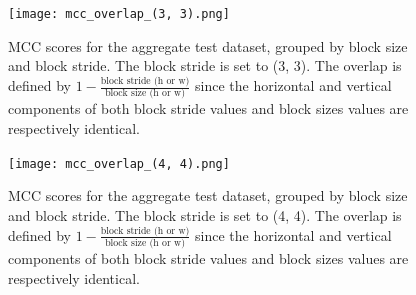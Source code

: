 \begin{figure}
    \centering
    \texttt{[image: mcc\_overlap\_(3, 3).png]}
    \caption{
        MCC scores for the aggregate test dataset, grouped by block size and block stride. The block stride is set to (3, 3). The overlap is defined by $1 - \frac{\text{block stride (h or w)}}{\text{block size (h or w)}}$ since the horizontal and vertical components of both block stride values and block sizes values are respectively identical.
    }
\end{figure}

\begin{figure}
    \centering
    \texttt{[image: mcc\_overlap\_(4, 4).png]}
    \caption{
        MCC scores for the aggregate test dataset, grouped by block size and block stride. The block stride is set to (4, 4). The overlap is defined by $1 - \frac{\text{block stride (h or w)}}{\text{block size (h or w)}}$ since the horizontal and vertical components of both block stride values and block sizes values are respectively identical.
    }
\end{figure}